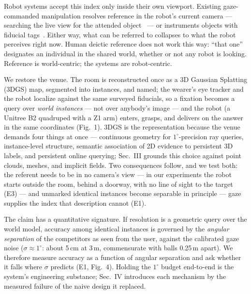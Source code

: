 \documentclass[letterpaper, 10 pt, conference]{ieeeconf}  %
\begin{document}
Robot systems accept this index only inside their own viewport.
Existing gaze-commanded manipulation resolves reference in the robot's
current camera --- searching the live view for the attended
object~\cite{famhri,gamma2026,rueppel2025} --- or instruments objects
with fiducial tags~\cite{ibotassistant}.
Either way, what can be referred to collapses to what the robot
perceives right now. Human deictic reference does not work this way:
``that one'' designates an individual in the shared world, whether or
not any robot is looking. Reference is world-centric; the systems are
robot-centric.

We restore the venue. The room is reconstructed once as a 3D Gaussian
Splatting (3DGS) map, segmented into instances, and named; the wearer's
eye tracker and the robot localize against the same surveyed fiducials,
so a fixation becomes a query over \emph{world instances} --- not over
anybody's image --- and the robot (a Unitree B2 quadruped with a Z1
arm) enters, grasps, and delivers on the answer in the same coordinates
(Fig.~1). 3DGS is the representation because the venue demands four
things at once --- continuous geometry for $1^\circ$-precision ray
queries, instance-level structure, semantic association of 2D evidence
to persistent 3D labels, and persistent online querying; Sec.~III
grounds this choice against point clouds, meshes, and implicit fields.
Two consequences follow, and we test both: the referent needs to be in
no camera's view --- in our experiments the robot starts outside the
room, behind a doorway, with no line of sight to the target (E3) ---
and unmarked identical instances become separable in principle ---
gaze supplies the index that description cannot (E1).

The claim has a quantitative signature. If resolution is a geometric
query over the world model, accuracy among identical instances is
governed by the \emph{angular separation} of the competitors as seen
from the user, against the calibrated gaze noise
($\sigma\!\approx\!1^\circ$: about 5\,cm at 3\,m, commensurate with
balls 0.25\,m apart). We therefore measure accuracy as a function of
angular separation and ask whether it falls where $\sigma$ predicts
(E1, Fig.~4). Holding the $1^\circ$ budget end-to-end is the system's
engineering substance; Sec.~IV introduces each mechanism by the
measured failure of the naive design it replaced.
\end{document}
